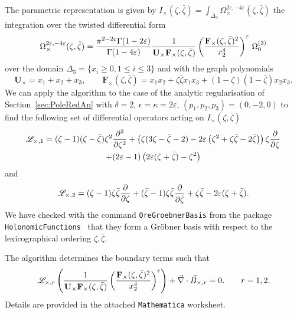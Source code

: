 \documentclass[a4paper,12pt]{article}
\numberwithin{equation}{section}
\numberwithin{figure}{section}
\begin{document}
The parametric representation is given by
$
  I_\times(\zeta,\bar\zeta)= \int_{\Delta_3}   \Omega_\times^{2\varepsilon,-4\varepsilon}(\zeta,\bar\zeta)
$ the integration over the twisted differential form
\begin{equation}
  \Omega_\times^{2\varepsilon,-4\varepsilon}(\zeta,\bar\zeta)={\pi^{2-2\varepsilon}\Gamma(1-2\varepsilon)\over\Gamma(1-4\varepsilon)} {1\over \textbf{U}_\times
    \textbf{F}_\times (\zeta,\bar\zeta)} \left(
    \textbf{F}_\times (\zeta,\bar\zeta)^{2}\over  x_2^{4}\right)^\varepsilon  \, \Omega_0^{(3)}
\end{equation}
over the domain $\Delta_3=\{x_i\geq0, 1\leq i\leq 3\}$ and with the graph polynomials
\begin{equation}
  \textbf{U}_\times= x_1+x_2+x_3,  \qquad \textbf{F}_\times (\zeta,\bar\zeta)= x_1x_2+
  \zeta\bar\zeta x_1x_3+ (1-\zeta)(1-\bar\zeta)x_2x_3  .
\end{equation}
We can apply the algorithm to the case of the analytic regularisation
of Section~\ref{sec:PoleRedAn} 
with $\delta=2$, $\epsilon=\kappa=2\varepsilon$, $(p_1,p_2,p_3)=(0,-2,0)$
to find the following set of  differential operators
acting on $I_\times(\zeta,\bar\zeta)$
\begin{multline}
  \mathscr{L}_{\times,1}= (\zeta -1) (\zeta -\bar\zeta) \zeta ^2{\partial^2\over\partial\zeta^2}  +
   \left(\zeta (3 \zeta -\bar\zeta-2)-2\varepsilon  \left(\zeta ^2+\zeta 
   \bar\zeta-2 \bar\zeta\right) \right) \zeta {\partial\over\partial\zeta}\cr+(2 \varepsilon -1) \left(2 \varepsilon  (\zeta +\bar\zeta)-\zeta ^2\right)
\end{multline}
and
\begin{equation}
  \mathscr{L}_{\times,2}= (\zeta -1)\zeta\bar\zeta{\partial\over\partial\zeta}  +
   (\bar\zeta -1)\zeta\bar\zeta{\partial\over\partial\bar\zeta}+\zeta\bar\zeta-2\varepsilon(\zeta+\bar\zeta).
 \end{equation}
 We have checked  with
  the command {\tt OreGroebnerBasis} from the package {\tt
    HolonomicFunctions}~\cite{Koutchan} that
they form a Gr\"obner basis with respect to the lexicographical
ordering $\zeta,\bar\zeta$.

 The algorithm determines the boundary terms 
 such that
 \begin{equation}
   \mathscr{L}_{\times,r}    \left( {1\over \textbf{U}_\times
    \textbf{F}_\times (\zeta,\bar\zeta)} \left(
    \textbf{F}_\times (\zeta,\bar\zeta)^{2}\over
    x_2^{4}\right)^\varepsilon \right)+ \vec\nabla\cdot\vec B_{\times,r}=0.
\qquad r=1,2.
\end{equation}
%
Details are provided in the  attached {\tt Mathematica} worksheet. 
\end{document}
